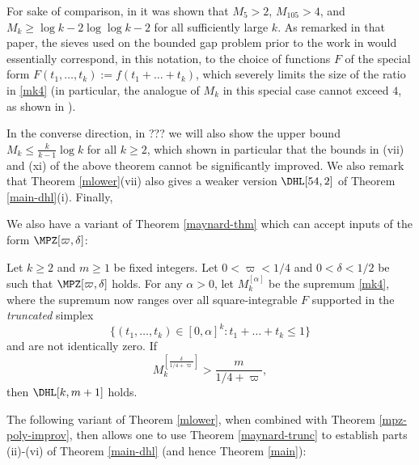 For sake of comparison, in \cite[Proposition 4.3]{maynard-new} it was shown that $M_5 > 2$, $M_{105} > 4$, and $M_k \geq \log k - 2\log\log k - 2$ for all sufficiently large $k$.  As remarked in that paper, the sieves used on the bounded gap problem prior to the work in \cite{maynard-new} would essentially correspond, in this notation, to the choice of functions $F$ of the special form $F(t_1,\dots,t_k) := f(t_1+\dots+t_k)$, which severely limits the size of the ratio in
\eqref{mk4} (in particular, the analogue of $M_k$ in this special case cannot exceed $4$, as shown in \cite{sound}).

In the converse direction, in ??? we will also show the upper bound $M_k \leq \frac{k}{k-1} \log k$ for all $k \geq 2$, which shown in particular that the bounds in (vii) and (xi) of the above theorem cannot be significantly improved.  We also remark that Theorem \ref{mlower}(vii) also gives a weaker version $\DHL[54,2]$ of Theorem \ref{main-dhl}(i).  Finally, 

We also have a variant of Theorem \ref{maynard-thm} which can accept inputs of the form $\MPZ[\varpi,\delta]$:

\begin{theorem}\label{maynard-trunc}  Let $k \geq 2$ and $m \geq 1$ be fixed integers. Let $0<\varpi<1/4$ and $0 <\delta < 1/2$ be such that $\MPZ[\varpi,\delta]$ holds.  For any $\alpha>0$, let $M_k^{[\alpha]}$ be the supremum \eqref{mk4}, where the supremum now ranges over all square-integrable $F$ supported in the \emph{truncated} simplex
\begin{equation}\label{ttk}
 \{ (t_1,\dots,t_k) \in [0,\alpha]^k: t_1+\dots+t_k \leq 1 \}
\end{equation}
and are not identically zero.  If
$$ M_k^{[\frac{\delta}{1/4+\varpi}]} > \frac{m}{1/4+\varpi},$$
then $\DHL[k,m+1]$ holds.
\end{theorem}

The following variant of Theorem \ref{mlower}, when combined with Theorem \ref{mpz-poly-improv}, then allows one to use Theorem \ref{maynard-trunc} to establish parts (ii)-(vi) of Theorem \ref{main-dhl} (and hence Theorem \ref{main}):


